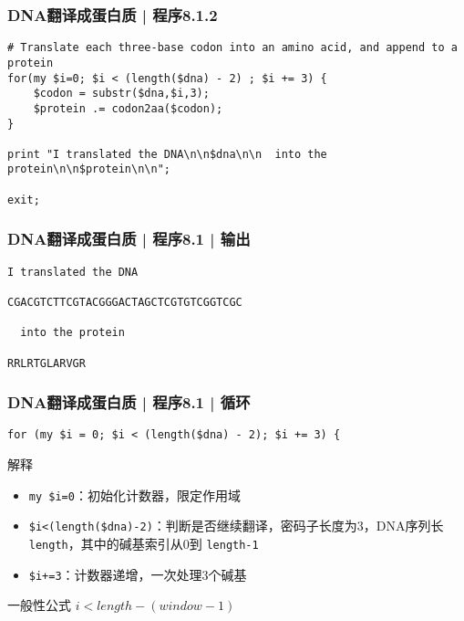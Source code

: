\begin{frame}[fragile]
  \frametitle{DNA翻译成蛋白质 | 程序8.1.2}
\begin{lstlisting}[firstnumber=13]
# Translate each three-base codon into an amino acid, and append to a protein 
for(my $i=0; $i < (length($dna) - 2) ; $i += 3) {
    $codon = substr($dna,$i,3);
    $protein .= codon2aa($codon);
}

print "I translated the DNA\n\n$dna\n\n  into the protein\n\n$protein\n\n";

exit;
\end{lstlisting}
\end{frame}

\begin{frame}[fragile]
  \frametitle{DNA翻译成蛋白质 | 程序8.1 | 输出}
\begin{lstlisting}
I translated the DNA

CGACGTCTTCGTACGGGACTAGCTCGTGTCGGTCGC

  into the protein

RRLRTGLARVGR
\end{lstlisting}
\end{frame}

\begin{frame}[fragile]
  \frametitle{DNA翻译成蛋白质 | 程序8.1 | \alert{循环}}
\begin{lstlisting}
for (my $i = 0; $i < (length($dna) - 2); $i += 3) {
\end{lstlisting}
\pause
\begin{block}{解释}
  \begin{itemize}
    \item \verb|my $i=0|：初始化计数器，限定作用域
    \item \verb|$i<(length($dna)-2)|：判断是否继续翻译，密码子长度为3，DNA序列长 \verb|length|，其中的碱基索引从0到 \verb|length-1|
    \item \verb|$i+=3|：计数器递增，一次处理3个碱基
  \end{itemize}
\end{block}
\pause
\begin{block}{一般性公式}
$i < length - (window - 1)$
\end{block}
\end{frame}

